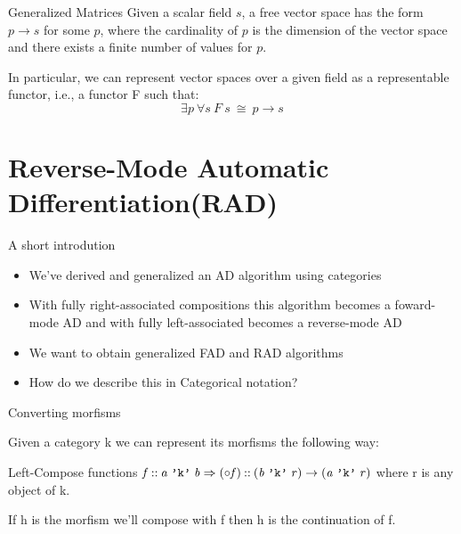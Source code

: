 \documentclass{beamer}
\theoremstyle{definition}
\theoremstyle{definition}
\theoremstyle{theorem}
\newcommand{\Varid}[1]{\mathit{#1}}
\begin{document}
\begin{frame}{Generalized Matrices}
Given a scalar field $s$, a free vector space has the form $p \to s$ for some $p$, where the
cardinality of $p$ is the dimension of the vector space and there exists a finite number of values for $p$.

\pause

\vspace{5mm}

In particular, we can represent vector spaces over a given field as a representable functor, i.e., a functor F such that: $$\exists p\ \forall s\ F\ s\ \cong\ p \to s$$
\end{frame}

\section{Reverse-Mode Automatic Differentiation(RAD)}


\begin{frame}{A short introdution}

\begin{itemize}
    \item We've derived and generalized an AD algorithm using categories
    \item With fully right-associated compositions this algorithm becomes a foward-mode AD and with fully left-associated becomes a reverse-mode AD
    \item We want to obtain generalized FAD and RAD algorithms 
    \item How do we describe this in Categorical notation?
\end{itemize}

\end{frame}




\begin{frame}{Converting morfisms}

Given a category k we can represent its morfisms the following way:

\begin{block}{Left-Compose functions}
\ensuremath{\Varid{f}\mathbin{::}\Varid{a}\;\text{\tt 'k'}\;\Varid{b}\Rightarrow(\mathbin{\circ}\Varid{f})\mathbin{::}(\Varid{b}\;\text{\tt 'k'}\;\Varid{r})\rightarrow (\Varid{a}\;\text{\tt 'k'}\;\Varid{r})} where r is any object of k.
\end{block}

If h is the morfism we'll compose with f then h is the continuation of f.
\end{frame}
\end{document}
